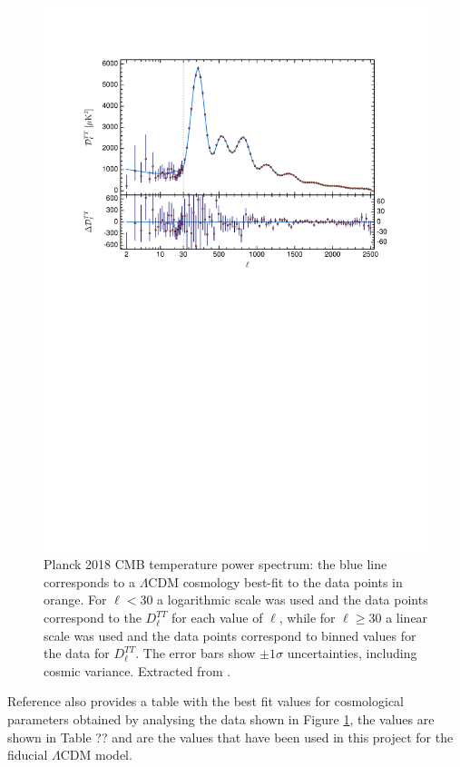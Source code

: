 \documentclass[openany,a4paper,12pt,oneside]{book}
\begin{document}
\begin{spacing}{1.5}
\begin{figure}[!htb]
    \centering
    \includegraphics[width=.9\linewidth]{Imagens/planck_spectrum.pdf}
    \caption{Planck 2018 CMB temperature power spectrum: the blue line corresponds to a $\Lambda$CDM cosmology best-fit to the data points in orange. For $\ell<30$ a logarithmic scale was used and the data points correspond to the $D_\ell^{TT}$ for each value of $\ell$, while for $\ell\ge 30$ a linear scale was used and the data points correspond to binned values for the data for $D_{\ell}^{TT}$. The error bars show $\pm 1\sigma$ uncertainties, including cosmic variance. Extracted from \cite{Planck_results}.}
    \label{fig:Planck_spectrum}
\end{figure} 

Reference \cite{Planck_results} also provides a table with the best fit values for cosmological parameters obtained by analysing the data shown in Figure \ref{fig:Planck_spectrum}, the values are shown in Table ?? and are the values that have been used in this project for the fiducial $\Lambda$CDM model. 


\end{spacing}
\end{document}
